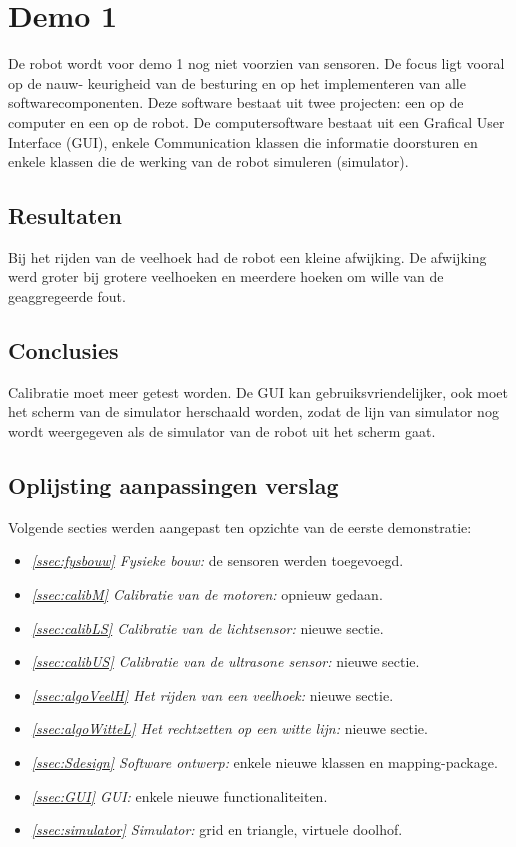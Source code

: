 \documentclass[tt3]{penoverslag}
\begin{document}
\newpage
\makeappendix

\section{Demo 1} %
\label{Asec:demo1}
De robot wordt voor demo 1 nog niet voorzien van sensoren. De focus ligt vooral op de nauw-
keurigheid van de besturing en op het implementeren van alle softwarecomponenten. Deze software
bestaat uit twee projecten: een op de computer en een op de robot. De computersoftware bestaat
uit een Grafical User Interface (GUI), enkele Communication klassen die informatie doorsturen en
enkele klassen die de werking van de robot simuleren (simulator).

\subsection{Resultaten} %
\label{Assec:result1}
Bij het rijden van de veelhoek had de robot een kleine afwijking. De afwijking werd groter bij grotere veelhoeken en meerdere hoeken om wille van de geaggregeerde fout.

\subsection{Conclusies} %
\label{Assec:conc1}
Calibratie moet meer getest worden. De GUI kan gebruiksvriendelijker, ook moet het scherm van de simulator herschaald worden, zodat de lijn van simulator nog wordt weergegeven als de simulator van de robot uit het scherm gaat.

\subsection{Oplijsting aanpassingen verslag} %
\label{Assec:aanp1}
Volgende secties werden aangepast ten opzichte van de eerste demonstratie:

\begin{itemize}
\item \textit{\ref{ssec:fysbouw} Fysieke bouw:} de sensoren werden toegevoegd.
\item \textit{\ref{ssec:calibM} Calibratie van de motoren:} opnieuw gedaan.
\item \textit{\ref{ssec:calibLS} Calibratie van de lichtsensor:} nieuwe sectie.
\item \textit{\ref{ssec:calibUS} Calibratie van de ultrasone sensor:} nieuwe sectie.
\item \textit{\ref{ssec:algoVeelH} Het rijden van een veelhoek:} nieuwe sectie.
\item \textit{\ref{ssec:algoWitteL} Het rechtzetten op een witte lijn:} nieuwe sectie.
\item \textit{\ref{ssec:Sdesign} Software ontwerp:} enkele nieuwe klassen en mapping-package.
\item \textit{\ref{ssec:GUI} GUI:} enkele nieuwe functionaliteiten.
\item \textit{\ref{ssec:simulator} Simulator:} grid en triangle, virtuele doolhof.
\end{itemize}
\end{document}
